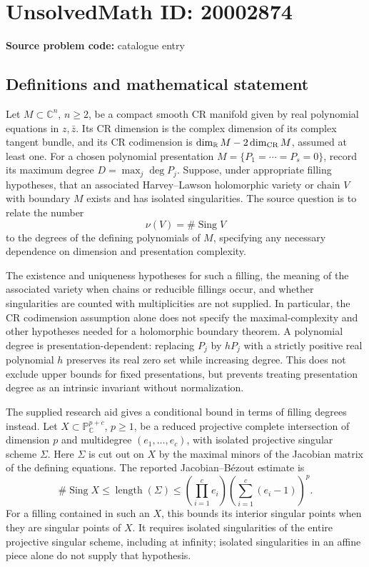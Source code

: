 \documentclass[11pt]{article}
\newcommand{\R}{\mathbb{R}}
\newcommand{\C}{\mathbb{C}}
\newcommand{\PP}{\mathbb{P}}
\begin{document}
\section*{UnsolvedMath ID: 20002874}
\textbf{Source problem code:} catalogue entry
\subsection{Definitions and mathematical statement}
Let \(M\subset\C^n\), \(n\ge2\), be a compact smooth CR manifold given by real polynomial equations in \(z,\bar z\). Its CR dimension is the complex dimension of its complex tangent bundle, and its CR codimension is \(\dim_{\R}M-2\dim_{\rm CR}M\), assumed at least one. For a chosen polynomial presentation \(M=\{P_1=\cdots=P_s=0\}\), record its maximum degree \(D=\max_j\deg P_j\). Suppose, under appropriate filling hypotheses, that an associated Harvey--Lawson holomorphic variety or chain \(V\) with boundary \(M\) exists and has isolated singularities. The source question is to relate the number
\[
\nu(V)=\#\operatorname{Sing}V
\]
to the degrees of the defining polynomials of \(M\), specifying any necessary dependence on dimension and presentation complexity.

The existence and uniqueness hypotheses for such a filling, the meaning of the associated variety when chains or reducible fillings occur, and whether singularities are counted with multiplicities are not supplied. In particular, the CR codimension assumption alone does not specify the maximal-complexity and other hypotheses needed for a holomorphic boundary theorem. A polynomial degree is presentation-dependent: replacing \(P_j\) by \(hP_j\) with a strictly positive real polynomial \(h\) preserves its real zero set while increasing degree. This does not exclude upper bounds for fixed presentations, but prevents treating presentation degree as an intrinsic invariant without normalization.

The supplied research aid gives a conditional bound in terms of filling degrees instead. Let \(X\subset\PP^{p+c}_{\C}\), \(p\ge1\), be a reduced projective complete intersection of dimension \(p\) and multidegree \((e_1,\ldots,e_c)\), with isolated projective singular scheme \(\Sigma\). Here \(\Sigma\) is cut out on \(X\) by the maximal minors of the Jacobian matrix of the defining equations. The reported Jacobian--B\'ezout estimate is
\[
\#\operatorname{Sing}X\le\operatorname{length}(\Sigma)
\le\left(\prod_{i=1}^ce_i\right)\left(\sum_{i=1}^c(e_i-1)\right)^p.
\]
For a filling contained in such an \(X\), this bounds its interior singular points when they are singular points of \(X\). It requires isolated singularities of the entire projective singular scheme, including at infinity; isolated singularities in an affine piece alone do not supply that hypothesis.
\end{document}
